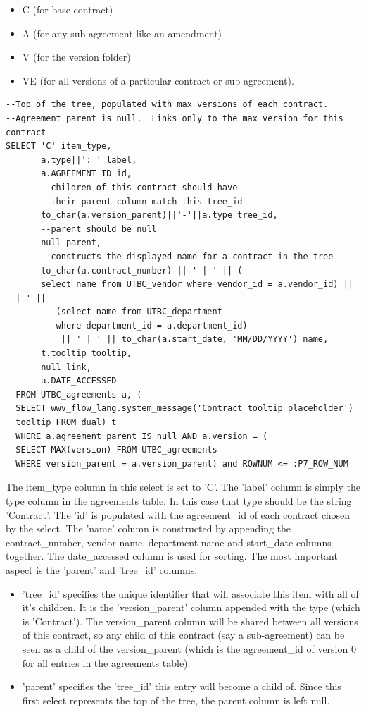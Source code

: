 \documentclass{report}
\begin{document}
\begin{itemize}
	\item C  (for base contract)
	\item A  (for any sub-agreement like an amendment)
	\item V  (for the version folder)
	\item VE (for all versions of a particular contract or sub-agreement).
\end{itemize}

\begin{lstlisting}[caption=Selecting the max version of each contract in the agreements table.]
--Top of the tree, populated with max versions of each contract.  
--Agreement parent is null.  Links only to the max version for this contract
SELECT 'C' item_type,
       a.type||': ' label,
       a.AGREEMENT_ID id,
       --children of this contract should have 
       --their parent column match this tree_id
       to_char(a.version_parent)||'-'||a.type tree_id,
       --parent should be null
       null parent,
       --constructs the displayed name for a contract in the tree
       to_char(a.contract_number) || ' | ' || (
       select name from UTBC_vendor where vendor_id = a.vendor_id) || ' | ' ||
          (select name from UTBC_department 
          where department_id = a.department_id)
           || ' | ' || to_char(a.start_date, 'MM/DD/YYYY') name, 
       t.tooltip tooltip,
       null link,
       a.DATE_ACCESSED
  FROM UTBC_agreements a, (
  SELECT wwv_flow_lang.system_message('Contract tooltip placeholder') 
  tooltip FROM dual) t
  WHERE a.agreement_parent IS null AND a.version = (
  SELECT MAX(version) FROM UTBC_agreements 
  WHERE version_parent = a.version_parent) and ROWNUM <= :P7_ROW_NUM
\end{lstlisting}

The item\_type column in this select is set to 'C'.  The 'label' column is simply the type column in the agreements table.  In this case that type should be the string 'Contract'.  The 'id' is populated with the agreement\_id of each contract chosen by the select.  The 'name' column is constructed by appending the contract\_number, vendor name, department name and start\_date columns together.  The date\_accessed column is used for sorting.  The most important aspect is the 'parent' and 'tree\_id' columns.

\begin{itemize}
	\item 'tree\_id' specifies the unique identifier that will associate this item with all of it's children.  It is the 'version\_parent' column appended with the type (which is 'Contract').  The version\_parent column will be shared between all versions of this contract, so any child of this contract (say a sub-agreement) can be seen as a child of the version\_parent (which is the agreement\_id of version 0 for all entries in the agreements table).
	\item 'parent' specifies the 'tree\_id' this entry will become a child of.  Since this first select represents the top of the tree, the parent column is left null.
\end{itemize}
\end{document}
